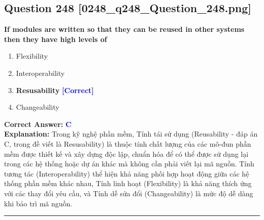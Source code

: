 \documentclass[11pt,a4paper]{article}
\begin{document}
\begin{minipage}{\textwidth}
\subsection*{Question 248 \quad \footnotesize{[0248\_q248\_Question\_248.png]}}
\noindent \textbf{If modules are written so that they can be reused in other systems then they have high levels of}

\begin{enumerate}[label=\Alph*.]
    \item Flexibility
    \item Interoperability
    \item \textbf{Resusability} \hfill \textcolor{blue}{\textbf{[Correct]}}
    \item Changeability
\end{enumerate}

\noindent \textbf{Correct Answer:} \textcolor{blue}{\textbf{C}} \\[2pt]
\noindent \textbf{Explanation:} Trong kỹ nghệ phần mềm, Tính tái sử dụng (Reusability - đáp án C, trong đề viết là Resusability) là thuộc tính chất lượng của các mô-đun phần mềm được thiết kế và xây dựng độc lập, chuẩn hóa để có thể được sử dụng lại trong các hệ thống hoặc dự án khác mà không cần phải viết lại mã nguồn. Tính tương tác (Interoperability) thể hiện khả năng phối hợp hoạt động giữa các hệ thống phần mềm khác nhau, Tính linh hoạt (Flexibility) là khả năng thích ứng với các thay đổi yêu cầu, và Tính dễ sửa đổi (Changeability) là mức độ dễ dàng khi bảo trì mã nguồn.

\par\vspace{0.3cm}
\hrule
\vspace{0.3cm}
\end{minipage}
\end{document}

